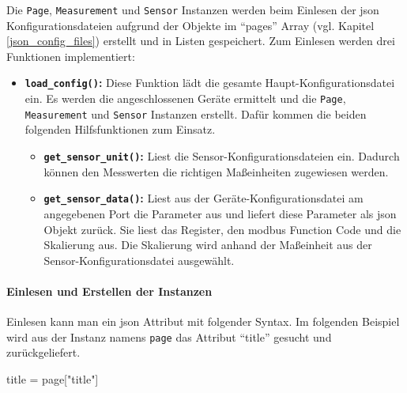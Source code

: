 Die \lstinline{Page}, \lstinline{Measurement} und \lstinline{Sensor} Instanzen werden beim Einlesen der \acs{json} Konfigurationsdateien aufgrund der Objekte im \enquote{pages}  Array (vgl. Kapitel \ref{json_config_files}) erstellt und in Listen gespeichert. \newline
Zum Einlesen werden drei Funktionen implementiert:
\begin{itemize}
	\item \textbf{\lstinline{load_config()}:} Diese Funktion lädt die gesamte Haupt-Konfigurationsdatei ein. Es werden die angeschlossenen Geräte ermittelt und die \lstinline{Page}, \lstinline{Measurement} und \lstinline{Sensor} Instanzen erstellt. Dafür kommen die beiden folgenden Hilfsfunktionen zum Einsatz.
    \begin{itemize}
		\item \textbf{\lstinline{get_sensor_unit()}:} Liest die Sensor-Konfigurationsdateien ein. Dadurch können den Messwerten die richtigen Maßeinheiten zugewiesen werden.
		\item \textbf{\lstinline{get_sensor_data()}:} Liest aus der Geräte-Konfigurationsdatei am angegebenen Port die Parameter aus und liefert diese Parameter als \acs{json} Objekt zurück. Sie liest das Register, den \gls{modbus} Function Code und die Skalierung aus. Die Skalierung wird anhand der Maßeinheit aus der Sensor-Konfigurationsdatei ausgewählt.
	\end{itemize}
\end{itemize}

\paragraph{Einlesen und Erstellen der Instanzen}
Einlesen kann man ein \acs{json} Attribut mit folgender Syntax. Im folgenden Beispiel wird aus der Instanz namens \lstinline{page} das Attribut \enquote{title} gesucht und zurückgeliefert.
\begin{pythoncode}
title = page["title"]
\end{pythoncode}

